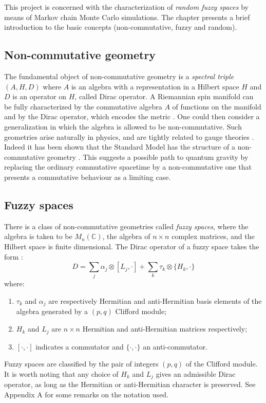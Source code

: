 This project is concerned with the characterization of \emph{random fuzzy spaces} by means of Markov chain Monte Carlo simulations. The chapter presents a brief introduction to the basic concepts (non-commutative, fuzzy and random).

\subsection{Non-commutative geometry} \label{sec:ncg}
The fundamental object of non-commutative geometry is a \emph{spectral triple} $(A, H, D)$ where $A$ is an algebra with a representation in a Hilbert space $H$ and $D$ is an operator on $H$, called Dirac operator. A Riemannian spin manifold can be fully characterized by the commutative algebra $A$ of functions on the manifold and by the Dirac operator, which encodes the metric \cite{connesRECON} \cite{connesGRAVMAT}. One could then consider a generalization in which the algebra is allowed to be non-commutative. Such geometries arise naturally in physics, and are tightly related to gauge theories \cite{suijlekom}. Indeed it has been shown that the Standard Model has the structure of a non-commutative geometry \cite{connesSAP} \cite{barrettLOR} \cite{connesNEUT}. This suggests a possible path to quantum gravity by replacing the ordinary commutative spacetime by a non-commutative one that presents a commutative behaviour as a limiting case.

\subsection{Fuzzy spaces} \label{sec:fuzzy}
There is a class of non-commutative geometries called \emph{fuzzy spaces}, where the algebra is taken to be $M_n(\mathbb{C})$, the algebra of $n \times n$ complex matrices, and the Hilbert space is finite dimensional. The Dirac operator of a fuzzy space takes the form \cite{barrett}:
\begin{equation}\label{eq:dirac_bad}
D = \sum_j \alpha_j \otimes [L_j, \cdot ] + \sum_k \tau_k \otimes \{H_k, \cdot \}
\end{equation}
where:
\begin{enumerate}
\item  $\tau_k$ and $\alpha_j$ are respectively Hermitian and anti-Hermitian basis elements of the algebra generated by a $(p, q)$ Clifford module;
\item $H_k$ and $L_j$ are $n \times n$ Hermitian and anti-Hermitian matrices respectively;
\item $[\cdot , \cdot]$ indicates a commutator and $\{ \cdot , \cdot \}$ an anti-commutator.  
\end{enumerate}
Fuzzy spaces are classified by the pair of integers $(p, q)$ of the Clifford module. It is worth noting that any choice of $H_k$ and $L_j$ gives an admissible Dirac operator, as long as the Hermitian or anti-Hermitian character is preserved.\newline
See Appendix A for some remarks on the notation used.

